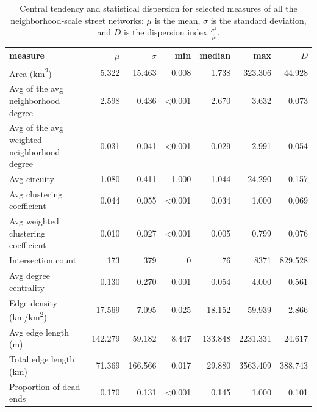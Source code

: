 \documentclass[Afour,sageh,times]{sagej}
\begin{document}
\begin{table}
\centering
\caption{Central tendency and statistical dispersion for selected measures of all the neighborhood-scale street networks: $\mu$ is the mean, $\sigma$ is the standard deviation, and $D$ is the dispersion index $\frac{\sigma ^ 2}{\mu}$.}
\label{tab:measures_neighborhoods}
\begin{tabular}{ l r r r r r r }
	\toprule
	measure                                          & $\mu$   & $\sigma$& min            & median         & max      & $D$     \\
	\midrule
	Area (km\textsuperscript{2})                     & 5.322   & 15.463  & 0.008          & 1.738          & 323.306  & 44.928  \\
	Avg of the avg neighborhood degree               & 2.598   & 0.436   & \textless0.001 & 2.670          & 3.632    & 0.073   \\
	Avg of the avg weighted neighborhood degree      & 0.031   & 0.041   & \textless0.001 & 0.029          & 2.991    & 0.054   \\
	Avg circuity                                     & 1.080   & 0.411   & 1.000          & 1.044          & 24.290   & 0.157   \\
	Avg clustering coefficient                       & 0.044   & 0.055   & \textless0.001 & 0.034          & 1.000    & 0.069   \\
	Avg weighted clustering coefficient              & 0.010   & 0.027   & \textless0.001 & 0.005          & 0.799    & 0.076   \\
	Intersection count                               & 173     & 379     & 0              & 76             & 8371     & 829.528 \\
	Avg degree centrality                            & 0.130   & 0.270   & 0.001          & 0.054          & 4.000    & 0.561   \\
	Edge density (km/km\textsuperscript{2})          & 17.569  & 7.095   & 0.025          & 18.152         & 59.939   & 2.866   \\
	Avg edge length (m)                              & 142.279 & 59.182  & 8.447          & 133.848        & 2231.331 & 24.617  \\
	Total edge length (km)                           & 71.369  & 166.566 & 0.017          & 29.880         & 3563.409 & 388.743 \\
	Proportion of dead-ends                          & 0.170   & 0.131   & \textless0.001 & 0.145          & 1.000    & 0.101   \\

\end{tabular}
\end{table}
\end{document}
